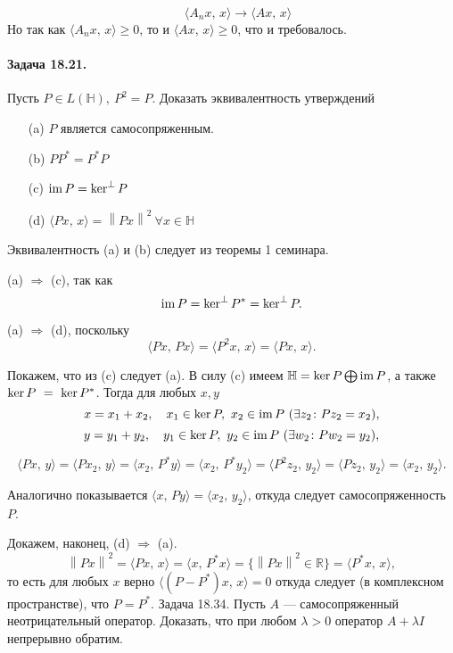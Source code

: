 \documentclass[16pt]{article}
\newenvironment{Sol}{\par\noindent{\it Решение:}}
\DeclareMathOperator{\Ker}{ker}
\DeclareMathOperator{\Ima}{im}
\newcommand\Real{\mathbb{R}}
\newcommand\Scal[2]{\langle #1,\, #2 \rangle}
\newcommand\Norm[1]{\left\| #1 \right\|}
\begin{document}
\begin{Sol}
$$\quad \Scal{A_nx}{x} \to \Scal{Ax}{x}$$
Но так как $\Scal{A_nx}{x} \geqslant 0$, то и $\Scal{Ax}{x} \geqslant 0$, что и требовалось.
\end{Sol}
\newpage
\paragraph{Задача 18.21.} Пусть $P\in L(\mathbb{H}), \ P^2 = P$. Доказать эквивалентность утверждений
\begin{itemize}
\item[(a)] $P$ является самосопряженным.
\item[(b)] $PP^* = P^*P$
\item[(c)] $\Ima P = \Ker^\bot P$
\item[(d)] $\Scal{Px}{x} = \Norm{Px}^2 \ \forall x \in \mathbb{H}$
\end{itemize}

\begin{Sol}
Эквивалентность (a) и (b) следует из теоремы 1 семинара.

(a) $\Rightarrow$ (c), так как
$$\Ima P = \Ker^\bot P^* = \Ker^\bot P.$$

(a) $\Rightarrow$ (d), поскольку
$$\Scal{Px}{Px} = \Scal{P^2x}{x} = \Scal{Px}{x}.$$

Покажем, что из (c) следует (a). В силу (c) имеем $\mathbb{H} = \Ker P \bigoplus \Ima P$, а также
 $\Ker P~=~\Ker P^*$. Тогда для любых $x, y$
 $$x = x_1 + x_2, \quad x_1 \in \Ker P, \ x_2 \in \Ima P \ (\exists z_2\colon Pz_2 = x_2),$$
 $$y = y_1 + y_2, \quad y_1 \in \Ker P, \ y_2 \in \Ima P \ (\exists w_2\colon Pw_2 = y_2),$$
 
$$\Scal{Px}{y} = \Scal{Px_2}{y} = \Scal{x_2}{P^*y} = \Scal{x_2}{P^*y_2} = \Scal{P^2z_2}{y_2} = \Scal{Pz_2}{y_2} = 
\Scal{x_2}{y_2}.$$

Аналогично показывается $\Scal{x}{Py} = \Scal{x_2}{y_2}$, откуда следует самосопряженность $P$.

Докажем, наконец, (d) $\Rightarrow$ (a). 
$$\Norm{Px}^2 = \Scal{Px}{x} = \Scal{x}{P^*x} = \{\Norm{Px}^2 \in \Real\} = \Scal{P^*x}{x},$$
то есть для любых $x$ верно $\Scal{(P-P^*)x}{x} = 0$ откуда следует (в комплексном пространстве), что $P = P^*$.
\end{Sol}

\paragraph{Задача 18.34.} Пусть $A$ --- самосопряженный неотрицательный оператор. Доказать, что при любом
$\lambda > 0$ оператор $A + \lambda I$ непрерывно обратим.
\end{document}
